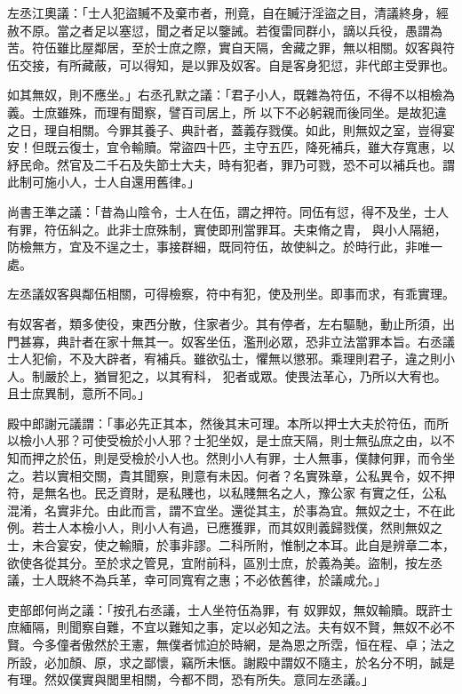 \begin{pinyinscope}
 左丞江奧議：「士人犯盜贓不及棄市者，刑竟，自在贓汙淫盜之目，清議終身，經赦不原。當之者足以塞愆，聞之者足以鑒誡。若復雷同群小，謫以兵役，愚謂為苦。符伍雖比屋鄰居，至於士庶之際，實自天隔，舍藏之罪，無以相關。奴客與符伍交接，有所藏蔽，可以得知，是以罪及奴客。自是客身犯愆，非代郎主受罪也。



 如其無奴，則不應坐。」右丞孔默之議：「君子小人，既雜為符伍，不得不以相檢為義。士庶雖殊，而理有聞察，譬百司居上，所
 以下不必躬親而後同坐。是故犯違之日，理自相關。今罪其養子、典計者，蓋義存戮僕。如此，則無奴之室，豈得宴安！但既云復士，宜令輸贖。常盜四十匹，主守五匹，降死補兵，雖大存寬惠，以紓民命。然官及二千石及失節士大夫，時有犯者，罪乃可戮，恐不可以補兵也。謂此制可施小人，士人自還用舊律。」



 尚書王準之議：「昔為山陰令，士人在伍，謂之押符。同伍有愆，得不及坐，士人有罪，符伍糾之。此非士庶殊制，實使即刑當罪耳。夫束脩之胄，
 與小人隔絕，防檢無方，宜及不逞之士，事接群細，既同符伍，故使糾之。於時行此，非唯一處。



 左丞議奴客與鄰伍相關，可得檢察，符中有犯，使及刑坐。即事而求，有乖實理。



 有奴客者，類多使役，東西分散，住家者少。其有停者，左右驅馳，動止所須，出門甚寡，典計者在家十無其一。奴客坐伍，濫刑必眾，恐非立法當罪本旨。右丞議士人犯偷，不及大辟者，宥補兵。雖欲弘士，懼無以懲邪。乘理則君子，違之則小人。制嚴於上，猶冒犯之，以其宥科，
 犯者或眾。使畏法革心，乃所以大宥也。且士庶異制，意所不同。」



 殿中郎謝元議謂：「事必先正其本，然後其末可理。本所以押士大夫於符伍，而所以檢小人邪？可使受檢於小人邪？士犯坐奴，是士庶天隔，則士無弘庶之由，以不知而押之於伍，則是受檢於小人也。然則小人有罪，士人無事，僕隸何罪，而令坐之。若以實相交關，貴其聞察，則意有未因。何者？名實殊章，公私異令，奴不押符，是無名也。民乏資財，是私賤也，以私賤無名之人，豫公家
 有實之任，公私混淆，名實非允。由此而言，謂不宜坐。還從其主，於事為宜。無奴之士，不在此例。若士人本檢小人，則小人有過，已應獲罪，而其奴則義歸戮僕，然則無奴之士，未合宴安，使之輸贖，於事非謬。二科所附，惟制之本耳。此自是辨章二本，欲使各從其分。至於求之管見，宜附前科，區別士庶，於義為美。盜制，按左丞議，士人既終不為兵革，幸可同寬宥之惠；不必依舊律，於議咸允。」



 吏部郎何尚之議：「按孔右丞議，士人坐符伍為罪，有
 奴罪奴，無奴輸贖。既許士庶緬隔，則聞察自難，不宜以難知之事，定以必知之法。夫有奴不賢，無奴不必不賢。今多僮者傲然於王憲，無僕者怵迫於時網，是為恩之所霑，恒在程、卓；法之所設，必加顏、原，求之鄙懷，竊所未愜。謝殿中謂奴不隨主，於名分不明，誠是有理。然奴僕實與閭里相關，今都不問，恐有所失。意同左丞議。」




\end{pinyinscope}
